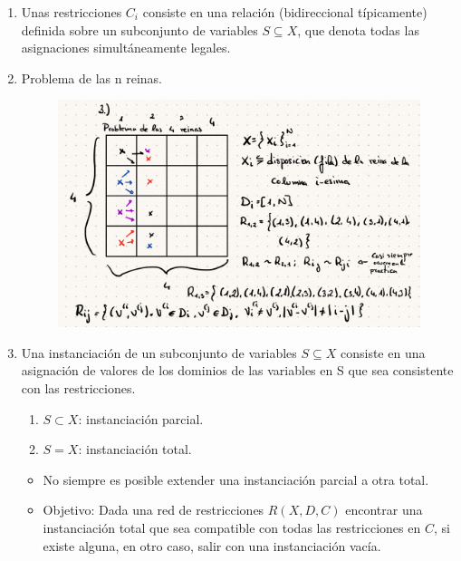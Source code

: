 \documentclass[12pt, twoside, openright]{report} %
\begin{document}
  
\begin{enumerate}
\def\labelenumi{\arabic{enumi}.}
\setcounter{enumi}{1}

\item
  Unas restricciones \(C_i\) consiste en una relación (bidireccional
  típicamente) definida sobre un subconjunto de variables
  \(S \subseteq X\), que denota todas las asignaciones simultáneamente
  legales.

  \item
    Problema de las n reinas.
	\begin{figure}[H]
		{\includegraphics[scale=.25]{Untitled 35.png}}
	\end{figure}
  \item
    Una instanciación de un subconjunto de variables \(S \subseteq X\)
    consiste en una asignación de valores de los dominios de las
    variables en S que sea consistente con las restricciones.

    \begin{enumerate}
  
    \item
      \(S \subset X\): instanciación parcial.
	  \item
    \(S = X\): instanciación total.
    \end{enumerate}
  

    \begin{itemize}
  
    \item
      No siempre es posible extender una instanciación parcial a otra
      total.

	\item
	  Objetivo: Dada una red de restricciones \(R(X, D, C)\) encontrar una
	  instanciación total que sea compatible con todas las restricciones en
	  \(C\), si existe alguna, en otro caso, salir con una instanciación
	  vacía.
    \end{itemize}


\end{enumerate}
\end{document}
